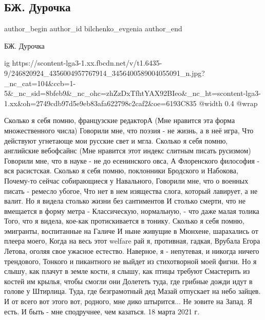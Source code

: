  
 
 
 
 
 
\subsection{БЖ. Дурочка}
\label{sec:18_10_2021.fb.bilchenko_evgenia.6.durochka}
 
\ifcmt
 author_begin
   author_id bilchenko_evgenia
 author_end
\fi

БЖ. Дурочка

\ifcmt
  ig https://scontent-lga3-1.xx.fbcdn.net/v/t1.6435-9/246820924_4356004957767914_3456400589004055091_n.jpg?_nc_cat=104&ccb=1-5&_nc_sid=8bfeb9&_nc_ohc=zhZzDxTfhtYAX92BIeo&_nc_ht=scontent-lga3-1.xx&oh=2749cdb97d5e9eb83afa622798c2caf2&oe=6193C835
  @width 0.4
  @wrap 
\fi

Сколько я себя помню, французские редакторА
(Мне нравится эта форма множественного числа)
Говорили мне, что поэзия -  не жизнь, а в неё игра,
Что действуют угнетающе мои русские свет и мгла.
Сколько я себя помню, английские вебофсайнс
(Мне нравится этот индекс слитным писать русизмом)
Говорили мне, что в науке - не до есенинского овса,
А Флоренского философия - вся расистская.
Сколько я себя помню, поклонники Бродского и Набокова,
Почему-то сейчас собирающиеся у Навального,
Говорили мне, что о военных писать - ремесло убогое,
Что нет в нем изящества слога, который лавирует, а не валит.
Но я видела столько жизни без сантиментов
И столько смерти, что не вмещается в форму метра -
Классическую, нормальную, - что даже малая толика
Того, что я видела, кое-как протискивается в тонику.
Сколько я себя помню, эмигранты, воспитанные на Галиче
И ныне живущие в Мюнхене, шарахались от плеера моего,
Когда на весь этот welfare рай я, противная, гадкая,
Врубала Егора Летова, оголяя свое ужасное естество.
Наверное, я - непутевая, и никогда ничего трендового,
Тонкого и пикантного не выйдет из стихотворной моей фигни.
Но я слышу, как плачут в земле кости, я слышу, как птицы требуют
Смастерить из костей им крылья, чтобы смогли они
Долететь туда, где грибные дожди идут в голове у Штирлица.
Туда, где безграмотный дед Мазай отпускает на небо зайцев.
И от всего вот этого вот, родного, мне дико штырится...
Не зовите на Запад. Я есть. И быть - мне сподручнее, чем казаться. 
18 марта 2021 г.
